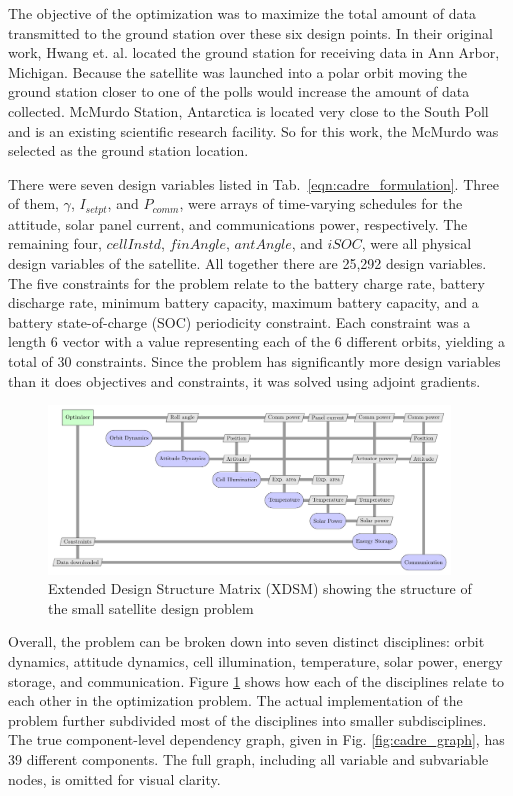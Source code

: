 \documentclass[]{aiaa-tc} %
\begin{document}
    The objective of the optimization was to maximize the total amount of data transmitted to the ground
    station over these six design points. In their original work, Hwang et. al. located the ground station 
    for receiving data in Ann Arbor, Michigan. Because the satellite was launched into a polar orbit moving the ground station 
    closer to one of the polls would increase the amount of data collected. McMurdo Station, 
    Antarctica is located very close to the South Poll and is an existing scientific research facility. 
    So for this work, the McMurdo was selected as the ground station location. 

    There were seven design variables listed in Tab.~\ref{eqn:cadre_formulation}.
    Three of them, $\gamma$, $I_{setpt}$, and $P_{comm}$, were arrays of time-varying schedules for the attitude,
    solar panel current, and communications power, respectively. The remaining four, $cellInstd$, $finAngle$, $antAngle$, and $iSOC$,
    were all physical design variables of the satellite. All together there are 25,292 design variables.
    The five constraints for the problem relate to the battery charge rate, battery discharge rate,
    minimum battery capacity, maximum battery capacity, and a battery state-of-charge (SOC) periodicity
    constraint. Each constraint was a length 6 vector with a value representing each of the 6 different
    orbits, yielding a total of 30 constraints. Since the problem has significantly more design
    variables than it does objectives and constraints, it was solved using adjoint gradients.


    \begin{figure}[!htbp]
        \centering
        \includegraphics[width=0.95\textwidth]{xdsm/cadre_xdsm}
        \caption{Extended Design Structure Matrix (XDSM) showing the structure of the small satellite design problem}
        \label{fig:cadre_xdsm}
    \end{figure}

    Overall, the problem can be broken down into seven distinct disciplines: orbit dynamics, attitude dynamics, cell illumination,
    temperature, solar power, energy storage, and communication. Figure \ref{fig:cadre_xdsm} shows how each of the disciplines
    relate to each other in the optimization problem. The actual implementation of the problem further
    subdivided most of the disciplines into smaller subdisciplines. The true component-level dependency
    graph, given in Fig. \ref{fig:cadre_graph}, has 39 different components. The full graph, including all variable and
    subvariable nodes, is omitted for visual clarity.
\end{document}
